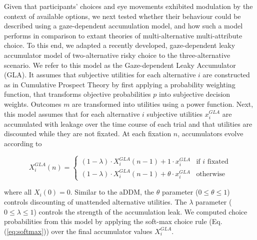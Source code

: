 \documentclass[11pt, a4paper]{article}
\begin{document}
Given that participants’ choices and eye movements exhibited modulation by the context of available options, we next tested whether their behaviour could be described using a gaze-dependent accumulation model, and how such a model performs in comparison to extant theories of multi-alternative multi-attribute choice. To this end, we adapted a recently developed, gaze-dependent leaky accumulator model of two-alternative risky choice \parencite{glickman2019FormationPreferenceRisky} to the three-alternative scenario. We refer to this model as the Gaze-dependent Leaky Accumulator (GLA). It assumes that subjective utilities for each alternative $i$ are constructed as in Cumulative Prospect Theory \parencite{tversky1992AdvancesProspectTheory} by first applying a probability weighting function, that transforms objective probabilities $p$ into subjective decision weights. Outcomes $m$ are transformed into utilities using a power function. Next, this model assumes that for each alternative $i$ subjective utilities $x_i^{GLA}$ are accumulated with leakage over the time course of each trial and that utilities are discounted while they are not fixated. At each fixation $n$, accumulators evolve according to

\begin{equation}
    \label{eq:gla:accumulator}
    X_i^{GLA}(n) = \begin{cases}
             (1 - \lambda) \cdot X_i^{GLA}(n - 1) + 1 \cdot x_i^{GLA} &\text{if $i$ fixated}\\
             (1 - \lambda) \cdot X_i^{GLA}(n - 1) + \theta \cdot x_i^{GLA} &\text{otherwise}
             \end{cases}
\end{equation}

where all $X_i(0)=0$. Similar to the aDDM, the $\theta$ parameter ($0 \le \theta \le 1$) controls discounting of unattended alternative utilities. The $\lambda$ parameter ($0 \le \lambda \le 1$) controls the strength of the accumulation leak. We computed choice probabilities from this model by applying the soft-max choice rule (Eq. (\ref{eq:softmax})) over the final accumulator values $X_i^{GLA}$.
\end{document}
